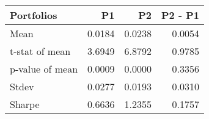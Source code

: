 \begin{tabular}{lrrr}
\toprule
Portfolios & P1 & P2 & P2 - P1 \\
\midrule
Mean & 0.0184 & 0.0238 & 0.0054 \\
t-stat of mean & 3.6949 & 6.8792 & 0.9785 \\
p-value of mean & 0.0009 & 0.0000 & 0.3356 \\
Stdev & 0.0277 & 0.0193 & 0.0310 \\
Sharpe & 0.6636 & 1.2355 & 0.1757 \\
\bottomrule
\end{tabular}
